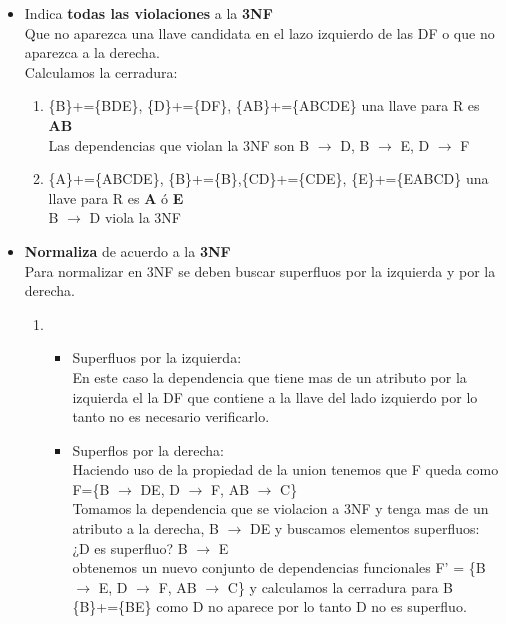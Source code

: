 \documentclass{article}
\begin{document}
\begin{enumerate}
   \begin{itemize}
   	\item Indica \textbf{todas las violaciones } a la \textbf{3NF}\\
   	Que no aparezca una llave candidata en el lazo izquierdo de las DF o que no aparezca a la derecha.\\
   	Calculamos la cerradura:\\
   	\begin{enumerate}
   		\item \{B\}+=\{BDE\}, \{D\}+=\{DF\}, \{AB\}+=\{ABCDE\} una llave para R es \textbf{AB}\\ Las dependencias que violan la 3NF son  B $\rightarrow$ D, B $\rightarrow$ E, D $\rightarrow$ F
   	    \item \{A\}+=\{ABCDE\}, \{B\}+=\{B\},\{CD\}+=\{CDE\}, \{E\}+=\{EABCD\} una llave para R es \textbf{A} ó \textbf{E}\\ B $\rightarrow$ D viola la 3NF
   	\end{enumerate}
   	\item \textbf{Normaliza} de acuerdo a la \textbf{3NF}\\
   	Para normalizar en 3NF se deben buscar superfluos por la izquierda y por la derecha.
   	\begin{enumerate}
   		\item \begin{itemize}
   			\item Superfluos por la izquierda:\\
   			En este caso la dependencia que tiene mas de un atributo por la izquierda el la DF que contiene a la llave del lado izquierdo por lo tanto no es necesario verificarlo.\\
   			\item Superflos por la derecha:\\
   			Haciendo uso de la propiedad de la union tenemos que F queda como F=\{B $\rightarrow$ DE, D $\rightarrow$ F, AB $\rightarrow$ C\}\\
   			Tomamos la dependencia que se violacion a 3NF y tenga mas de un atributo a la derecha, B $\rightarrow$ DE y buscamos elementos superfluos:\\
   			¿D es superfluo? B $\rightarrow$ E\\
   			obtenemos un nuevo conjunto de dependencias funcionales F' = \{B $\rightarrow$ E, D $\rightarrow$ F, AB $\rightarrow$ C\} y calculamos la cerradura para B\\
   			\{B\}+=\{BE\} como D no aparece por lo tanto D no es superfluo.\\
   			

\end{itemize}
\end{enumerate}
\end{itemize}
\end{enumerate}
\end{document}
